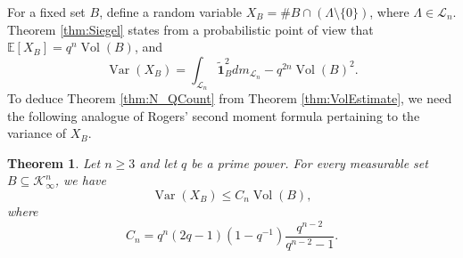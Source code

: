 \documentclass[11pt,a4paper,reqno]{amsart}
\newtheorem{theorem}{Theorem}[section]
\theoremstyle{definition}
\theoremstyle{remark}
\numberwithin{equation}{section}
\begin{document}
For a fixed set $B$, define a random variable $X_B=\#B\cap (\Lambda\setminus\{0\})$, where $\Lambda\in \mathcal{L}_n$. Theorem \ref{thm:Siegel} states from a probabilistic point of view that $\mathbb{E}[X_B]=q^n\operatorname{Vol}(B)$, and 
$$\operatorname{Var}(X_B)=\int_{\mathcal{L}_n}\widetilde{\mathbf{1}}_B^2dm_{\mathcal{L}_n}-q^{2n}\operatorname{Vol}(B)^2.$$ 
To deduce Theorem \ref{thm:N_QCount} from Theorem \ref{thm:VolEstimate}, we need the following analogue of Rogers' second moment formula \cite{Rogers1955} pertaining to the variance of $X_B$. 
\begin{theorem}
\label{thm:Rogers}
Let $n\ge 3$ and let $q$ be a prime power.
    For every measurable set $B\subseteq \mathcal{K}_{\infty}^n$, we have
    \begin{equation*}
        \operatorname{Var}(X_B)\le C_n\operatorname{Vol}(B),
    \end{equation*}
    where
    \begin{equation}
    \label{eqn:C_n}
    C_n=q^n(2q-1)(1-q^{-1})\frac{q^{n-2}}{q^{n-2}-1}.
    \end{equation}
\end{theorem}
\end{document}
